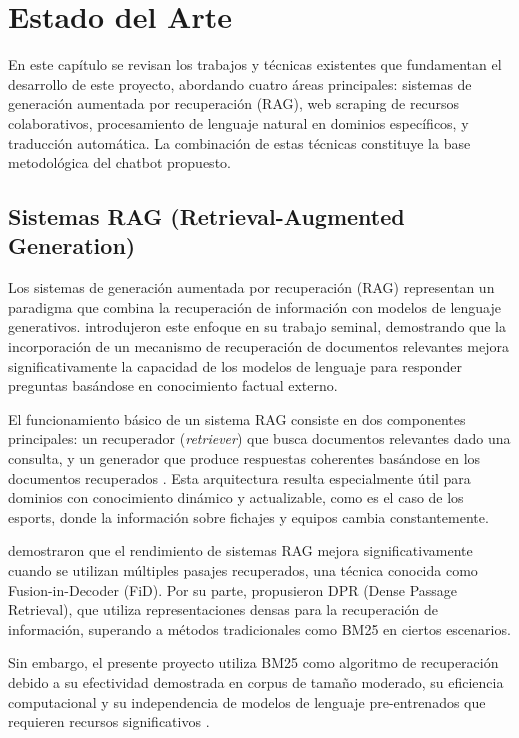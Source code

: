 ﻿\chapter{Estado del Arte}
\label{ch:estado_arte}

En este capítulo se revisan los trabajos y técnicas existentes que fundamentan el desarrollo de este proyecto, abordando cuatro áreas principales: sistemas de generación aumentada por recuperación (RAG), web scraping de recursos colaborativos, procesamiento de lenguaje natural en dominios específicos, y traducción automática. La combinación de estas técnicas constituye la base metodológica del chatbot propuesto.

\section{Sistemas RAG (Retrieval-Augmented Generation)}

Los sistemas de generación aumentada por recuperación (RAG) representan un paradigma que combina la recuperación de información con modelos de lenguaje generativos. \cite{lewis2020retrieval} introdujeron este enfoque en su trabajo seminal, demostrando que la incorporación de un mecanismo de recuperación de documentos relevantes mejora significativamente la capacidad de los modelos de lenguaje para responder preguntas basándose en conocimiento factual externo.

El funcionamiento básico de un sistema RAG consiste en dos componentes principales: un recuperador (\textit{retriever}) que busca documentos relevantes dado una consulta, y un generador que produce respuestas coherentes basándose en los documentos recuperados \cite{guu2020retrieval}. Esta arquitectura resulta especialmente útil para dominios con conocimiento dinámico y actualizable, como es el caso de los esports, donde la información sobre fichajes y equipos cambia constantemente.

\cite{izacard2021leveraging} demostraron que el rendimiento de sistemas RAG mejora significativamente cuando se utilizan múltiples pasajes recuperados, una técnica conocida como Fusion-in-Decoder (FiD). Por su parte, \cite{karpukhin2020dense} propusieron DPR (Dense Passage Retrieval), que utiliza representaciones densas para la recuperación de información, superando a métodos tradicionales como BM25 en ciertos escenarios.

Sin embargo, el presente proyecto utiliza BM25 como algoritmo de recuperación debido a su efectividad demostrada en corpus de tamaño moderado, su eficiencia computacional y su independencia de modelos de lenguaje pre-entrenados que requieren recursos significativos \cite{robertson2009probabilistic}.

